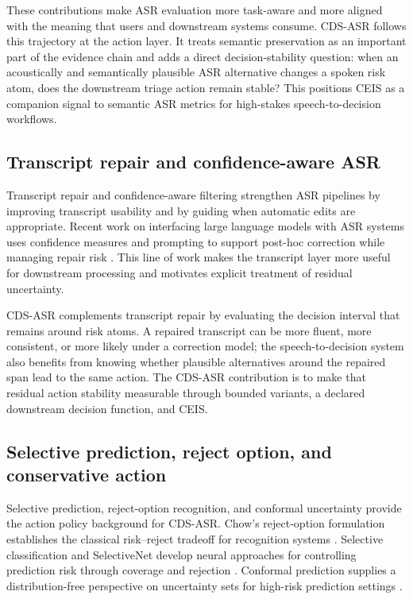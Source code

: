 These contributions make ASR evaluation more task-aware and more aligned with the meaning that users and downstream systems consume. CDS-ASR follows this trajectory at the action layer. It treats semantic preservation as an important part of the evidence chain and adds a direct decision-stability question: when an acoustically and semantically plausible ASR alternative changes a spoken risk atom, does the downstream triage action remain stable? This positions CEIS as a companion signal to semantic ASR metrics for high-stakes speech-to-decision workflows.

\subsection{Transcript repair and confidence-aware ASR}

Transcript repair and confidence-aware filtering strengthen ASR pipelines by improving transcript usability and by guiding when automatic edits are appropriate. Recent work on interfacing large language models with ASR systems uses confidence measures and prompting to support post-hoc correction while managing repair risk \citep{naderi2024llmconfidence}. This line of work makes the transcript layer more useful for downstream processing and motivates explicit treatment of residual uncertainty.

CDS-ASR complements transcript repair by evaluating the decision interval that remains around risk atoms. A repaired transcript can be more fluent, more consistent, or more likely under a correction model; the speech-to-decision system also benefits from knowing whether plausible alternatives around the repaired span lead to the same action. The CDS-ASR contribution is to make that residual action stability measurable through bounded variants, a declared downstream decision function, and CEIS.

\subsection{Selective prediction, reject option, and conservative action}

Selective prediction, reject-option recognition, and conformal uncertainty provide the action policy background for CDS-ASR. Chow's reject-option formulation establishes the classical risk--reject tradeoff for recognition systems \citep{chow1970reject}. Selective classification and SelectiveNet develop neural approaches for controlling prediction risk through coverage and rejection \citep{geifman2017selective,geifman2019selectivenet}. Conformal prediction supplies a distribution-free perspective on uncertainty sets for high-risk prediction settings \citep{angelopoulos2021conformal}.


